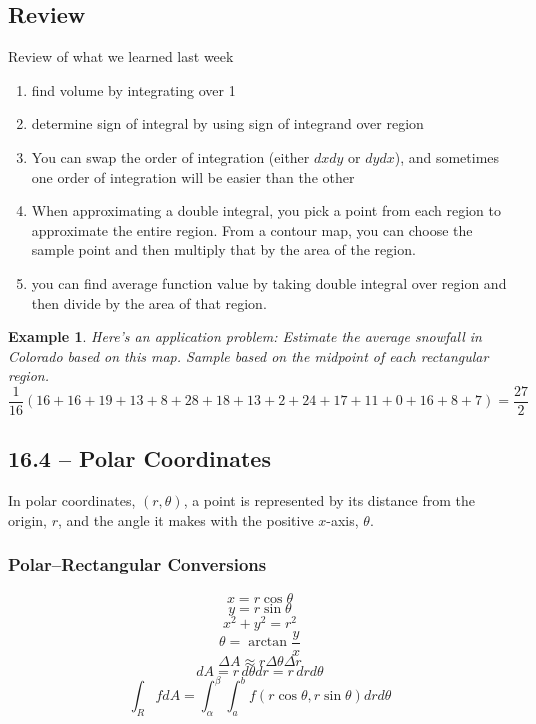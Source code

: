 \documentclass[11pt]{article}
\newtheorem{ex}{Example}
\begin{document}
\subsection{Review}
Review of what we learned last week
\begin{enumerate}
  \item find volume by integrating over 1
  \item determine sign of integral by using sign of integrand over region
  \item You can swap the order of integration (either $dx dy$ or $dy dx$), and sometimes
    one order of integration will be easier than the other
  \item When approximating a double integral, you pick a point from each region to approximate the
    entire region. From a contour map, you can choose the sample point and then multiply that
    by the area of the region.
  \item you can find average function value by taking double integral over region and
    then divide by the area of that region.
\end{enumerate}
\begin{ex}
  Here's an application problem:
  Estimate the average snowfall in Colorado based on this map. Sample based on the midpoint of each rectangular region.
  \[\frac{1}{16}(16+16+19+13+8+28+18+13+2+24+17+11+0+16+8+7) = \frac{27}{2}\]
\end{ex}
\subsection{16.4 -- Polar Coordinates}
In polar coordinates, $(r, \theta)$, a point is represented by its distance from the origin, $r$, and the angle it makes with the positive $x$-axis, $\theta$.

\subsubsection{Polar--Rectangular Conversions}
\[x = r\cos \theta\]
\[y=r\sin\theta\]
\[x^2+y^2=r^2\]
\[\theta = \arctan \frac{y}{x}\]
\[\Delta A \approx r \Delta \theta \Delta r\]
\[dA = r\, d\theta dr = r \, dr d\theta\]
\[\int_R f dA = \int_\alpha^\beta\int_a^b f(r\cos\theta, r\sin \theta) drd\theta\]
\end{document}
